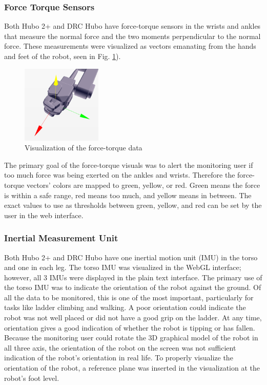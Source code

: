 \documentclass[letterpaper, 10 pt, conference]{ieee/ieeeconf}  %
\begin{document}
\subsubsection{Force Torque Sensors}
Both Hubo 2+ and DRC Hubo have force-torque sensors in the wrists and ankles that measure the normal force and the two moments perpendicular to the normal force.
These measurements were visualized as vectors emanating from the hands and feet of the robot, seen in Fig. \ref{fig:FT}).

\begin{figure}[thpb]
  \centering
  \includegraphics[width=1.5in]{figures/FT.png}
  \caption{Visualization of the force-torque data}
  \label{fig:FT}
\end{figure}

The primary goal of the force-torque visuals was to alert the monitoring user if too much force was being exerted on the ankles and wrists.
Therefore the force-torque vectors' colors are mapped to green, yellow, or red. 
Green means the force is within a safe range, red means too much, and yellow means in between.
The exact values to use as thresholds between green, yellow, and red can be set by the user in the web interface.

\subsubsection{Inertial Measurement Unit}
Both Hubo 2+ and DRC Hubo have one inertial motion unit (IMU) in the torso and one in each leg.
The torso IMU was visualized in the WebGL interface; however, all 3 IMUs were displayed in the plain text interface.
The primary use of the torso IMU was to indicate the orientation of the robot against the ground.
Of all the data to be monitored, this is one of the most important, particularly for tasks like ladder climbing and walking.
A poor orientation could indicate the robot was not well placed or did not have a good grip on the ladder.
At any time, orientation gives a good indication of whether the robot is tipping or has fallen.
Because the monitoring user could rotate the 3D graphical model of the robot in all three axis, the orientation of the robot on the screen was not sufficient indication of the robot's orientation in real life.
To properly visualize the orientation of the robot, a reference plane was inserted in the visualization at the robot's foot level.
\end{document}
